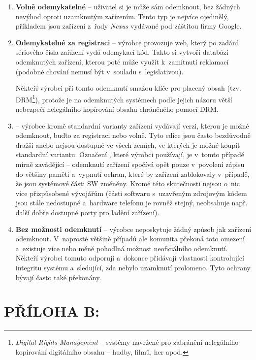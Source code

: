 \documentclass[12pt, a4paper, oneside]{article}
\newcommand{\B}{\textbf} %
\newcommand{\It}{\textit}  %
\begin{document}
\begin{enumerate}
    \item \B{Volně odemykatelné} -- uživatel si je může sám odemknout, bez žádných nevýhod oproti uzamknutým zařízením. Tento typ je nejvíce ojedinělý, příkladem jsou zařízení z~řady \It{Nexus} vydávané pod záštitou firmy Google.
    
    \item \B{Odemykatelné za registraci} -- výrobce provozuje web, který po zadání sériového čísla zařízení vydá odemykací kód. Takto si vytvoří databázi odemknutých zařízení, kterou poté může využít k~zamítnutí reklamací (podobné chování nemusí být v~souladu s~legislativou).
    
    Někteří výrobci při tomto odemknutí smažou klíče pro placený obsah (tzv. DRM\footnote{\It{Digital Rights Management} -- systémy navržené pro zabránění nelegálního kopírování digitálního obsahu -- hudby, filmů, her apod.}), protože je na odemknutých systémech podle jejich názoru větší nebezpečí nelegálního kopírování obsahu chráněného pomocí DRM.
    
    \item \B{} -- výrobce kromě standardní varianty zařízení vydávají verzi, kterou je možné odemknout, buďto za registraci nebo volně. Tyto edice jsou často bezdůvodně dražší anebo nejsou dostupné ve všech zemích, ve kterých je možné koupit standardní variantu. Označení , které výrobci používají, je v~tomto případě mírně zavádějící -- odemknutí zařízení spočívá opět pouze v~povolení zápisu do většiny paměti a~vypnutí ochran, které by zařízení zablokovaly v~případě, že jsou systémové části SW změněny. Kromě této skutečnosti nejsou o~nic více přizpůsobené vývojářům (části softwaru s~uzavřeným zdrojovým kódem jsou stále nedostupné a~hardware telefonu je rovněž stejný, neobsahuje např. další dobře dostupné porty pro ladění zařízení).

    \item \B{Bez možnosti odemknutí} -- výrobce neposkytuje žádný způsob jak zařízení odemknout. V~naprosté většině případů ale komunita překoná toto omezení a~existuje více nebo méně pohodlná možnost neoficiálního odemknutí. Někteří výrobci tomuto odporují a~dokonce přidávají vlastnosti kontrolující integritu systému a~sledující, zda nebylo uzamknutí prolomeno. Tyto ochrany bývají často také překonány.
    
\end{enumerate}

\newpage
\section*{PŘÍLOHA B:}
\end{document}
